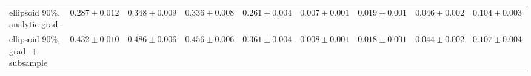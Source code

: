 \begin{table}[t]
{\begin{tabular}{l cccc cccc}
ellipsoid 90\%, analytic grad. & $0.287 \pm {\scriptstyle 0.012}$ & $0.348 \pm {\scriptstyle 0.009}$ & $0.336 \pm {\scriptstyle 0.008}$ & $0.261 \pm {\scriptstyle 0.004}$ & $0.007 \pm {\scriptstyle 0.001}$ & $0.019 \pm {\scriptstyle 0.001}$ & $0.046 \pm {\scriptstyle 0.002}$ & $0.104 \pm {\scriptstyle 0.003}$ \\
ellipsoid 90\%, grad. + subsample & $0.432 \pm {\scriptstyle 0.010}$ & $0.486 \pm {\scriptstyle 0.006}$ & $0.456 \pm {\scriptstyle 0.006}$ & $0.361 \pm {\scriptstyle 0.004}$ & $0.008 \pm {\scriptstyle 0.001}$ & $0.018 \pm {\scriptstyle 0.001}$ & $0.044 \pm {\scriptstyle 0.002}$ & $0.107 \pm {\scriptstyle 0.004}$ \\
\bottomrule
\end{tabular}
}
\end{table}
